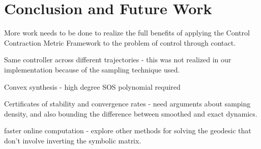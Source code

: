 \documentclass[journal]{IEEEtran}
\begin{document}
\section{Conclusion and Future Work}
More work needs to be done to realize the full benefits of applying the Control Contraction Metric Framework to the problem of control through contact. 


Same controller across different trajectories - this was not realized in our implementation because of the sampling technique used.

Convex synthesis - high degree SOS polynomial required

Certificates of stability and convergence rates - need arguments about samping density, and also bounding the difference between smoothed and exact dynamics.

faster online computation - explore other methods for solving the geodesic that don't involve inverting the symbolic matrix.

\printbibliography
\end{document}
